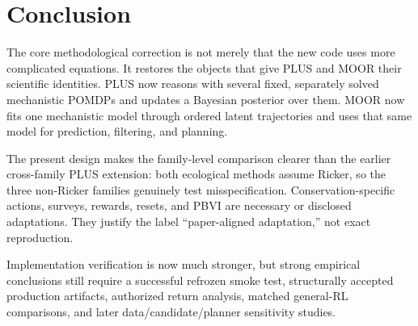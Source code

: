 \documentclass[11pt]{article}
\begin{document}
\section{Conclusion}

The core methodological correction is not merely that the new code uses more complicated equations.
It restores the objects that give PLUS and MOOR their scientific identities. PLUS now reasons with
several fixed, separately solved mechanistic POMDPs and updates a Bayesian posterior over them.
MOOR now fits one mechanistic model through ordered latent trajectories and uses that same model for
prediction, filtering, and planning.

The present design makes the family-level comparison clearer than the earlier cross-family PLUS
extension: both ecological methods assume Ricker, so the three non-Ricker families genuinely test
misspecification. Conservation-specific actions, surveys, rewards, resets, and PBVI are necessary or
disclosed adaptations. They justify the label ``paper-aligned adaptation,'' not exact reproduction.

Implementation verification is now much stronger, but strong empirical conclusions still require a
successful refrozen smoke test, structurally accepted production artifacts, authorized return
analysis, matched general-RL comparisons, and later data/candidate/planner sensitivity studies.
\end{document}
